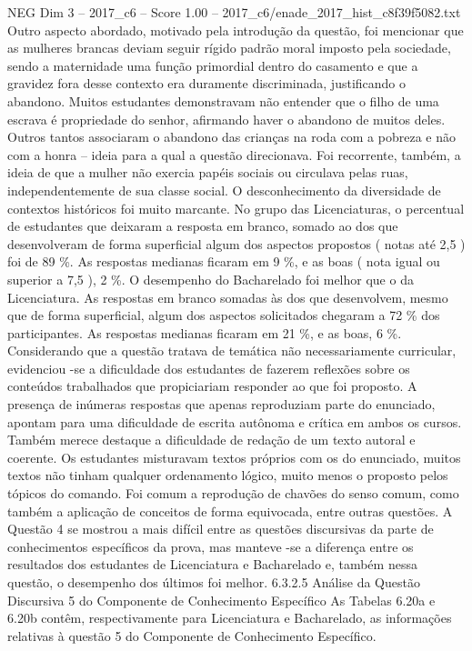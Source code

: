 \begin{textsample}{NEG Dim 3 – 2017\_c6 – Score 1.00 – 2017\_c6/enade\_2017\_hist\_c8f39f5082.txt}
Outro aspecto abordado, motivado pela introdução da questão, foi mencionar que as mulheres brancas deviam seguir rígido padrão moral imposto pela sociedade, sendo a maternidade uma função primordial dentro do casamento e que a gravidez fora desse contexto era duramente discriminada, justificando o abandono.
Muitos estudantes demonstravam não entender que o filho de uma escrava é propriedade do senhor, afirmando haver o abandono de muitos deles.
Outros tantos associaram o abandono das crianças na roda com a pobreza e não com a honra – ideia para a qual a questão direcionava.
Foi recorrente, também, a ideia de que a mulher não exercia papéis sociais ou circulava pelas ruas, independentemente de sua classe social.
O desconhecimento da diversidade de contextos históricos foi muito marcante.
No grupo das Licenciaturas, o percentual de estudantes que deixaram a resposta em branco, somado ao dos que desenvolveram de forma superficial algum dos aspectos propostos ( notas até 2,5 ) foi de 89 \%.
As respostas medianas ficaram em 9 \%, e as boas ( nota igual ou superior a 7,5 ), 2 \%.
O desempenho do Bacharelado foi melhor que o da Licenciatura.
As respostas em branco somadas às dos que desenvolvem, mesmo que de forma superficial, algum dos aspectos solicitados chegaram a 72 \% dos participantes.
As respostas medianas ficaram em 21 \%, e as boas, 6 \%.
Considerando que a questão tratava de temática não necessariamente curricular, evidenciou -se a dificuldade dos estudantes de fazerem reflexões sobre os conteúdos trabalhados que propiciariam responder ao que foi proposto.
A presença de inúmeras respostas que apenas reproduziam parte do enunciado, apontam para uma dificuldade de escrita autônoma e crítica em ambos os cursos.
Também merece destaque a dificuldade de redação de um texto autoral e coerente.
Os estudantes misturavam textos próprios com os do enunciado, muitos textos não tinham qualquer ordenamento lógico, muito menos o proposto pelos tópicos do comando.
Foi comum a reprodução de chavões do senso comum, como também a aplicação de conceitos de forma equivocada, entre outras questões.
A Questão 4 se mostrou a mais difícil entre as questões discursivas da parte de conhecimentos específicos da prova, mas manteve -se a diferença entre os resultados dos estudantes de Licenciatura e Bacharelado e, também nessa questão, o desempenho dos últimos foi melhor. 6.3.2.5 Análise da Questão Discursiva 5 do Componente de Conhecimento Específico As Tabelas 6.20a e 6.20b contêm, respectivamente para Licenciatura e Bacharelado, as informações relativas à questão 5 do Componente de Conhecimento Específico.

\end{textsample}
